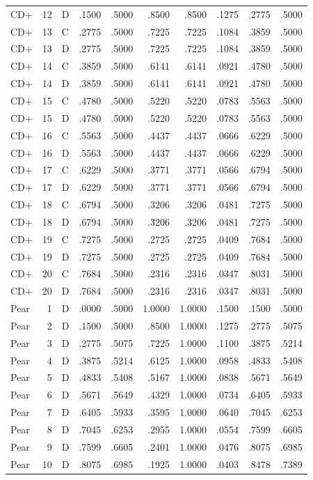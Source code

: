 \begin{longtable}{@{}lrlrrrrrrr@{}}
CD+ & 12 & D & .1500 & .5000 & .8500 & .8500 & .1275 & .2775 & .5000 \\
CD+ & 13 & C & .2775 & .5000 & .7225 & .7225 & .1084 & .3859 & .5000 \\
CD+ & 13 & D & .2775 & .5000 & .7225 & .7225 & .1084 & .3859 & .5000 \\
CD+ & 14 & C & .3859 & .5000 & .6141 & .6141 & .0921 & .4780 & .5000 \\
CD+ & 14 & D & .3859 & .5000 & .6141 & .6141 & .0921 & .4780 & .5000 \\
CD+ & 15 & C & .4780 & .5000 & .5220 & .5220 & .0783 & .5563 & .5000 \\
CD+ & 15 & D & .4780 & .5000 & .5220 & .5220 & .0783 & .5563 & .5000 \\
CD+ & 16 & C & .5563 & .5000 & .4437 & .4437 & .0666 & .6229 & .5000 \\
CD+ & 16 & D & .5563 & .5000 & .4437 & .4437 & .0666 & .6229 & .5000 \\
CD+ & 17 & C & .6229 & .5000 & .3771 & .3771 & .0566 & .6794 & .5000 \\
CD+ & 17 & D & .6229 & .5000 & .3771 & .3771 & .0566 & .6794 & .5000 \\
CD+ & 18 & C & .6794 & .5000 & .3206 & .3206 & .0481 & .7275 & .5000 \\
CD+ & 18 & D & .6794 & .5000 & .3206 & .3206 & .0481 & .7275 & .5000 \\
CD+ & 19 & C & .7275 & .5000 & .2725 & .2725 & .0409 & .7684 & .5000 \\
CD+ & 19 & D & .7275 & .5000 & .2725 & .2725 & .0409 & .7684 & .5000 \\
CD+ & 20 & C & .7684 & .5000 & .2316 & .2316 & .0347 & .8031 & .5000 \\
CD+ & 20 & D & .7684 & .5000 & .2316 & .2316 & .0347 & .8031 & .5000 \\
Pear & 1 & D & .0000 & .5000 & 1.0000 & 1.0000 & .1500 & .1500 & .5000 \\
Pear & 2 & D & .1500 & .5000 & .8500 & 1.0000 & .1275 & .2775 & .5075 \\
Pear & 3 & D & .2775 & .5075 & .7225 & 1.0000 & .1100 & .3875 & .5214 \\
Pear & 4 & D & .3875 & .5214 & .6125 & 1.0000 & .0958 & .4833 & .5408 \\
Pear & 5 & D & .4833 & .5408 & .5167 & 1.0000 & .0838 & .5671 & .5649 \\
Pear & 6 & D & .5671 & .5649 & .4329 & 1.0000 & .0734 & .6405 & .5933 \\
Pear & 7 & D & .6405 & .5933 & .3595 & 1.0000 & .0640 & .7045 & .6253 \\
Pear & 8 & D & .7045 & .6253 & .2955 & 1.0000 & .0554 & .7599 & .6605 \\
Pear & 9 & D & .7599 & .6605 & .2401 & 1.0000 & .0476 & .8075 & .6985 \\
Pear & 10 & D & .8075 & .6985 & .1925 & 1.0000 & .0403 & .8478 & .7389 \\
\end{longtable}
